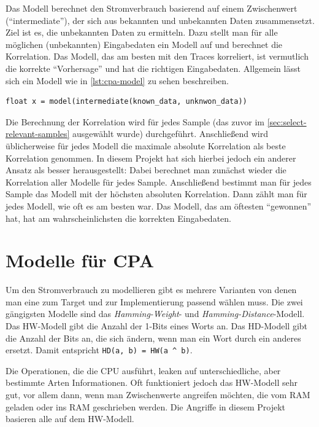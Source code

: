 \documentclass[a4paper,ngerman]{scrreprt}
\begin{document}
Das Modell berechnet den Stromverbrauch basierend auf einem Zwischenwert
(``intermediate''), der sich aus bekannten und unbekannten Daten zusammensetzt.
Ziel ist es, die unbekannten Daten zu ermitteln. Dazu stellt man für alle
möglichen (unbekannten) Eingabedaten ein Modell auf und berechnet die
Korrelation. Das Modell, das am besten mit den Traces korreliert, ist vermutlich
die korrekte ``Vorhersage'' und hat die richtigen Eingabedaten. Allgemein lässt
sich ein Modell wie in \autoref{lst:cpa-model} zu sehen beschreiben.

\begin{lstlisting}[caption={Allgemeines Modell für Stromverbrauch}, label=lst:cpa-model]
float x = model(intermediate(known_data, unknwon_data))
\end{lstlisting}

\medskip

Die Berechnung der Korrelation wird für jedes Sample (das zuvor im
\autoref{sec:select-relevant-samples} ausgewählt wurde) durchgeführt.
Anschließend wird üblicherweise für jedes Modell die maximale absolute
Korrelation als beste Korrelation genommen. In diesem Projekt hat sich hierbei
jedoch ein anderer Ansatz als besser herausgestellt: Dabei berechnet man
zunächst wieder die Korrelation aller Modelle für jedes Sample. Anschließend
bestimmt man für jedes Sample das Modell mit der höchsten absoluten Korrelation.
Dann zählt man für jedes Modell, wie oft es am besten war. Das Modell, das am
öftesten ``gewonnen'' hat, hat am wahrscheinlichsten die korrekten Eingabedaten.


\section{Modelle für CPA}

Um den Stromverbrauch zu modellieren gibt es mehrere Varianten von denen man
eine zum Target und zur Implementierung passend wählen muss. Die zwei gängigsten
Modelle sind das \emph{Hamming-Weight}- und \emph{Hamming-Distance}-Modell. Das
HW-Modell gibt die Anzahl der 1-Bits eines Worts an. Das HD-Modell gibt die
Anzahl der Bits an, die sich ändern, wenn man ein Wort durch ein anderes
ersetzt. Damit entspricht \verb+HD(a, b) = HW(a ^ b)+.

Die Operationen, die die CPU ausführt, leaken auf unterschiedliche, aber
bestimmte Arten Informationen. Oft funktioniert jedoch das HW-Modell sehr gut,
vor allem dann, wenn man Zwischenwerte angreifen möchten, die vom RAM geladen
oder ins RAM geschrieben werden. Die Angriffe in diesem Projekt basieren alle
auf dem HW-Modell.
\end{document}
